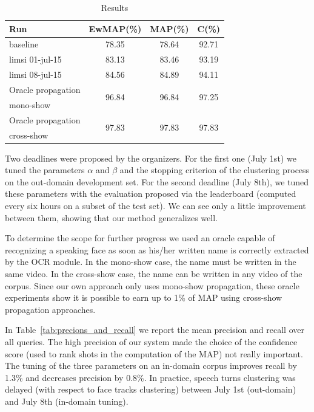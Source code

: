 \documentclass{acm_proc_article-me}
\begin{document}
\begin{table}[ht]
  \centering
  \begin{tabular}{|l|c|c|c|}
    \hline
	Run 											& EwMAP(\%)	& MAP(\%)	& C(\%) \\
	\hline
	\hline
	baseline~\cite{POIGNANT--INTERSPEECH--2012}	& 78.35		& 78.64		& 92.71		\\
	\hline
	limsi 01-jul-15 								& 83.13		& 83.46		& 93.19		\\
	limsi 08-jul-15 								& 84.56		& 84.89		& 94.11		\\
	\hline
	\hline
	Oracle propagation 	& \multirow{2}{*}{96.84}		& \multirow{2}{*}{96.84}		& \multirow{2}{*}{97.25}	\\
	mono-show			&							&							&			\\
	\hline
	Oracle propagation 	& \multirow{2}{*}{97.83}		& \multirow{2}{*}{97.83}		& \multirow{2}{*}{97.83}	\\
	cross-show 			&							&							&			\\
  	\hline
  \end{tabular}
  \caption{Results}
  \label{tab:results}
\end{table}

Two deadlines were proposed by the organizers. For the first one (July 1st) we tuned the parameters $\alpha$ and $\beta$ and the stopping criterion of the clustering process on the out-domain development set. For the second deadline (July 8th), we tuned these parameters with the evaluation proposed via the leaderboard (computed every six hours on a subset of the test set). We can see only a little improvement between them, showing that our method generalizes well.

To determine the scope for further progress we used an oracle capable of recognizing a speaking face as soon as his/her written name is correctly extracted by the OCR module. In the mono-show case, the name must be written in the same video. In the cross-show case, the name can be written in any video of the corpus. Since our own approach only uses mono-show propagation, these oracle experiments show it is possible to earn up to 1\% of MAP using cross-show propagation approaches.

In Table~\ref{tab:precions_and_recall} we report the mean precision and recall over all queries. The high precision of our system made the choice of the confidence score (used to rank shots in the computation of the MAP) not really important. The tuning of the three parameters on an in-domain corpus improves recall by 1.3\% and decreases precision by 0.8\%.
In practice, speech turns clustering was delayed (with respect to face tracks clustering) between July 1st (out-domain) and July 8th (in-domain tuning).
\end{document}
